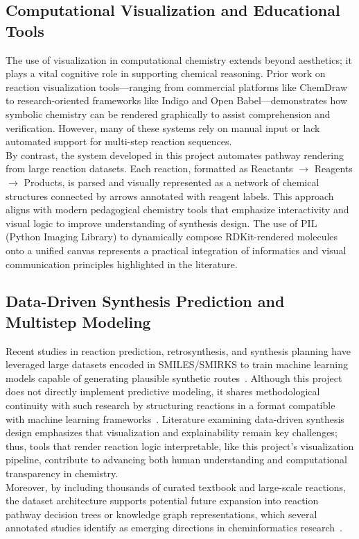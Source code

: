 \documentclass[12pt]{article}
\begin{document}
\subsection{Computational Visualization and Educational Tools}
\indent
The use of visualization in computational chemistry extends beyond aesthetics; it plays a vital cognitive role in supporting chemical reasoning.
Prior work on reaction visualization tools—ranging from commercial platforms like ChemDraw to research-oriented frameworks like Indigo and Open Babel—demonstrates how symbolic chemistry can be rendered graphically to assist comprehension and verification.
However, many of these systems rely on manual input or lack automated support for multi-step reaction sequences.
\\
\indent
By contrast, the system developed in this project automates pathway rendering from large reaction datasets. 
Each reaction, formatted as Reactants $\rightarrow$ Reagents $\rightarrow$ Products, is parsed and visually represented as a network of chemical structures connected by arrows annotated with reagent labels.
This approach aligns with modern pedagogical chemistry tools that emphasize interactivity and visual logic to improve understanding of synthesis design.
The use of PIL (Python Imaging Library) to dynamically compose RDKit-rendered molecules onto a unified canvas represents a practical integration of informatics and visual communication principles highlighted in the literature.
\\
\subsection{Data-Driven Synthesis Prediction and Multistep Modeling}
\indent
Recent studies in reaction prediction, retrosynthesis, and synthesis planning have leveraged large datasets encoded in SMILES/SMIRKS to train machine learning models capable of generating plausible synthetic routes~\cite{dai2019retrosynthesis}.
Although this project does not directly implement predictive modeling, it shares methodological continuity with such research by structuring reactions in a format compatible with machine learning frameworks~\cite{hormazabal2022cede}.
Literature examining data-driven synthesis design emphasizes that visualization and explainability remain key challenges; thus, tools that render reaction logic interpretable, like this project’s visualization pipeline, contribute to advancing both human understanding and computational transparency in chemistry.
\\
\indent
Moreover, by including thousands of curated textbook and large-scale reactions, the dataset architecture supports potential future expansion into reaction pathway decision trees or knowledge graph representations, which several annotated studies identify as emerging directions in cheminformatics research~\cite{10.1016/j.tcs.2025.115344}.
\end{document}
